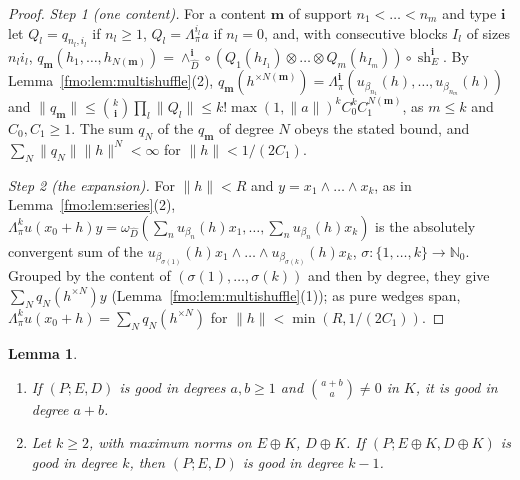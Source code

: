 \documentclass[11pt]{amsart}
\newtheorem{lemma}[theorem]{Lemma}
\theoremstyle{definition}
\theoremstyle{remark}
\numberwithin{equation}{section}
\newcommand{\N}{\mathbb N}
\newcommand{\norm}[1]{\lVert #1\rVert}
\theoremstyle{plain}
\theoremstyle{definition}
\theoremstyle{plain}
\newcommand{\sh}{\operatorname{sh}}
\begin{document}
\begin{proof}
\emph{Step 1 (one content).} For a content $\mathbf m$ of support $n_1<\dots<n_m$ and type $\mathbf i$ let
$Q_l=q_{n_l,i_l}$ if $n_l\ge1$, $Q_l=\Lambda^{i_l}_\pi a$ if $n_l=0$, and, with consecutive blocks $I_l$ of sizes $n_li_l$,
$q_{\mathbf m}(h_1,\dots,h_{N(\mathbf m)})=\wedge^{\mathbf i}_{\widehat D}\circ(Q_1(h_{I_1})\otimes\dots\otimes Q_m(h_{I_m}))
\circ\sh^{\mathbf i}_E$. By Lemma~\ref{fmo:lem:multishuffle}(2), $q_{\mathbf m}(h^{\times N(\mathbf m)})=\Lambda^{\mathbf i}_\pi
(u_{\beta_{n_1}}(h),\dots,u_{\beta_{n_m}}(h))$ and $\norm{q_{\mathbf m}}\le\binom k{\mathbf i}\prod_l\norm{Q_l}\le
k!\max(1,\norm a)^kC_0^kC_1^{N(\mathbf m)}$, as $m\le k$ and $C_0,C_1\ge1$. The sum $q_N$ of the $q_{\mathbf m}$ of degree
$N$ obeys the stated bound, and $\sum_N\norm{q_N}\norm h^N<\infty$ for $\norm h<1/(2C_1)$.

\emph{Step 2 (the expansion).} For $\norm h<R$ and $y=x_1\wedge\dots\wedge x_k$, as in Lemma~\ref{fmo:lem:series}(2),
$\Lambda^k_\pi u(x_0+h)y=\omega_{\widehat D}(\sum_nu_{\beta_n}(h)x_1,\dots,\sum_nu_{\beta_n}(h)x_k)$ is the absolutely
convergent sum of the $u_{\beta_{\sigma(1)}}(h)x_1\wedge\dots\wedge u_{\beta_{\sigma(k)}}(h)x_k$, $\sigma\colon\{1,\dots,k\}
\to\N_0$. Grouped by the content of $(\sigma(1),\dots,\sigma(k))$ and then by degree, they give $\sum_Nq_N(h^{\times N})y$
(Lemma~\ref{fmo:lem:multishuffle}(1)); as pure wedges span, $\Lambda^k_\pi u(x_0+h)=\sum_Nq_N(h^{\times N})$ for
$\norm h<\min(R,1/(2C_1))$.
\end{proof}

\begin{lemma}\label{fmo:lem:steps}
\begin{enumerate}
\item If $(P;E,D)$ is good in degrees $a,b\ge1$ and $\binom{a+b}a\ne0$ in $K$, it is good in degree $a+b$.
\item Let $k\ge2$, with maximum norms on $E\oplus K$, $D\oplus K$. If $(P;E\oplus K,D\oplus K)$ is good in degree $k$, then
$(P;E,D)$ is good in degree $k-1$.
\end{enumerate}
\end{lemma}
\end{document}
